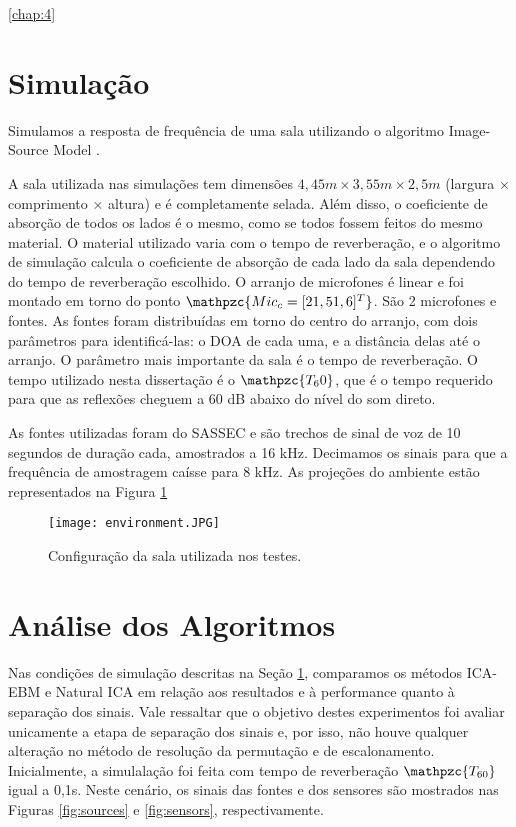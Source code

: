 \ref{chap:4}

\section{Simulação}\label{sec:simulation}

Simulamos a resposta de frequência de uma sala utilizando o algoritmo Image-Source Model \cite{simulation}.

A sala utilizada nas simulações tem dimensões $4,45m \times 3,55m \times 2,5m$ (largura × comprimento × altura) e é completamente selada. Além disso, o coeficiente de absorção de todos os lados é o mesmo, como se todos fossem feitos do mesmo material. O material utilizado varia com o tempo de reverberação, e o algoritmo de simulação calcula o coeficiente de absorção de cada lado da sala dependendo do
tempo de reverberação escolhido. O arranjo de microfones é linear e foi montado em torno do ponto $\mathpzc{Mic_c = [2 1,5 1,6]^T}$. São 2 microfones e fontes. As fontes foram distribuídas em torno do centro do arranjo, com dois parâmetros para identificá-las: o DOA de cada uma, e a distância delas até o arranjo. O parâmetro mais importante da sala é o tempo de reverberação. O tempo utilizado nesta dissertação é o $\mathpzc{T_60}$, que é o tempo requerido para que as reflexões cheguem a 60 dB abaixo do nível do som direto.

As fontes utilizadas foram do SASSEC e são trechos de sinal de voz de 10 segundos de duração cada, amostrados a 16 kHz. Decimamos os sinais para que a frequência de amostragem caísse para 8 kHz. As projeções do ambiente estão representados na Figura \ref{fig:environment}

\begin{figure}
    \centering
    \texttt{[image: environment.JPG]}
    \caption{Configuração da sala utilizada nos testes.}
    \label{fig:environment}
\end{figure}


 \section{Análise dos Algoritmos}\label{sec:analysis}
    
    Nas condições de simulação descritas na Seção \ref{sec:simulation}, comparamos os métodos ICA-EBM e Natural ICA em relação aos resultados e à performance quanto à separação dos sinais. Vale ressaltar que o objetivo destes experimentos foi avaliar unicamente a etapa de separação dos sinais e, por isso, não houve qualquer alteração no método de resolução da permutação e de escalonamento.  Inicialmente, a simulalação foi feita com tempo de reverberação $\mathpzc{T_{60}}$ igual a 0,1s. Neste cenário, os sinais das fontes e dos sensores são mostrados nas Figuras \ref{fig:sources} e \ref{fig:sensors}, respectivamente.
    
